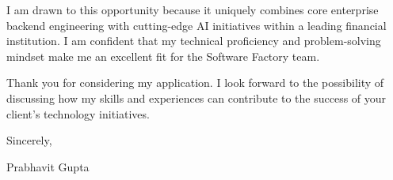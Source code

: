 \documentclass[11pt,a4paper]{article}
\begin{document}
\vspace{1em}
\noindent I am drawn to this opportunity because it uniquely combines core enterprise backend engineering with cutting-edge AI initiatives within a leading financial institution. I am confident that my technical proficiency and problem-solving mindset make me an excellent fit for the Software Factory team. 

\vspace{1em}
\noindent Thank you for considering my application. I look forward to the possibility of discussing how my skills and experiences can contribute to the success of your client's technology initiatives.

\vspace{2em}
\noindent Sincerely,

\vspace{2em}
\noindent Prabhavit Gupta
\end{document}
